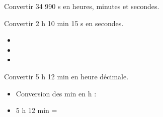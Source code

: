 \begin{Exemple}
\vspace{-0.5cm}
\begin{minipage}[c]{0.45\textwidth}
Convertir 34 990 s en heures, minutes et secondes. 

\ligne

\ligne

\ligne

\ligne


\end{minipage} \hfill \begin{minipage}[c]{0.25\textwidth}
\begin{center}
\end{center}
\end{minipage} \hfill \begin{minipage}[c]{0.25\textwidth}
\begin{center}
\end{center}
\end{minipage}

\end{Exemple}

\begin{Exemple}
Convertir 2 h 10 min 15 s en secondes.
\begin{itemize}[label=\textcolor{Couleur8}{$\bullet$}]
\item \ligne

\item \ligne

\item \ligne

\end{itemize}
\end{Exemple}

\begin{Exemple}
\begin{minipage}[c]{0.7\textwidth}
Convertir 5 h 12 min en heure décimale.
\begin{itemize}[label=\textcolor{Couleur8}{$\bullet$}]
\item Conversion des min en h : \ligne

\item 5 h 12 min = \ligne

\end{itemize}
\end{minipage} \hfill \begin{minipage}[c]{0.25\textwidth}
\begin{center}
\end{center}
\end{minipage}

\end{Exemple}

